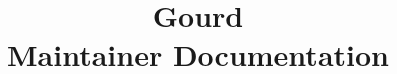 \documentclass[12pt,a4paper]{article}
\title{
  \huge
  Gourd\\
  Maintainer Documentation
}
\begin{document}
\maketitle

\pagebreak
\tableofcontents




\end{document}

